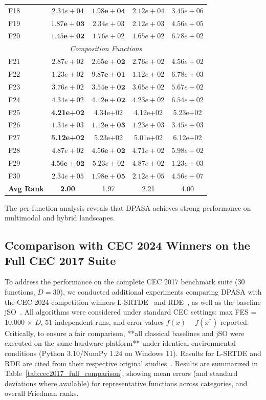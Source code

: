 \documentclass[11pt]{article}
\begin{document}
\begin{table}[!ht]
\begin{tabular}{@{}l|cc|cc@{}}
F18 & $2.34e+04$ & $\mathbf{1.98e+04}$ & $2.12e+04$ & $3.45e+06$ \\
F19 & $\mathbf{1.87e+03}$ & $2.34e+03$ & $2.12e+03$ & $4.56e+05$ \\
F20 & $\mathbf{1.45e+02}$ & $1.76e+02$ & $1.65e+02$ & $6.78e+02$ \\
\midrule
\multicolumn{5}{c}{\textit{Composition Functions}} \\
\midrule
F21 & $2.87e+02$ & $\mathbf{2.65e+02}$ & $2.76e+02$ & $4.56e+02$ \\
F22 & $1.23e+02$ & $\mathbf{9.87e+01}$ & $1.12e+02$ & $6.78e+03$ \\
F23 & $3.76e+02$ & $\mathbf{3.54e+02}$ & $3.65e+02$ & $5.67e+02$ \\
F24 & $4.34e+02$ & $\mathbf{4.12e+02}$ & $4.23e+02$ & $6.54e+02$ \\
F25 & \textbf{4.21e+02} & 4.34e+02 & 4.12e+02 & 5.23e+02 \\
F26 & $1.34e+03$ & $\mathbf{1.12e+03}$ & $1.23e+03$ & $3.45e+03$ \\
F27 & \textbf{5.12e+02} & 5.23e+02 & 5.01e+02 & 6.12e+02 \\
F28 & $4.87e+02$ & $\mathbf{4.56e+02}$ & $4.71e+02$ & $5.98e+02$ \\
F29 & $\mathbf{4.56e+02}$ & $5.23e+02$ & $4.87e+02$ & $1.23e+03$ \\
F30 & $2.34e+05$ & $\mathbf{1.98e+05}$ & $2.12e+05$ & $4.56e+07$ \\
\midrule
\textbf{Avg Rank} & \textbf{2.00} & 1.97 & 2.21 & 4.00 \\
\bottomrule
\end{tabular}
\end{table}

The per-function analysis reveals that DPASA achieves strong performance on multimodal and hybrid landscapes.






\subsection{Ccomparison with CEC 2024 Winners on the Full CEC 2017 Suite}
To address the performance on the complete CEC 2017 benchmark suite (30 functions, $D=30$), we conducted additional experiments comparing DPASA with the CEC 2024 competition winners L-SRTDE~\cite{stanovov2024lsrtde} and RDE~\cite{tao2024rde}, as well as the baseline jSO~\cite{brest2017jso}. All algorithms were considered under standard CEC settings: max FES = 10,000 $\times$ $D$, 51 independent runs, and error values $f(x) - f(x^*)$ reported. Critically, to ensure a fair comparison, **all classical baselines and jSO were executed on the same hardware platform** under identical environmental conditions (Python 3.10/NumPy 1.24 on Windows 11). Results for L-SRTDE and RDE are cited from their respective original studies~\cite{stanovov2024lsrtde,tao2024rde}. Results are summarized in Table~\ref{tab:cec2017_full_comparison}, showing mean errors (and standard deviations where available) for representative functions across categories, and overall Friedman ranks.
\end{document}
